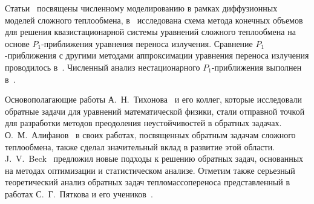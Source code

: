     Статьи~\cite{kovtanyuk2013iterative, Thommes2002, Pinnau2008, Siewert1991}
    посвящены численному моделированию в рамках
    диффузионных моделей сложного теплообмена, в~\cite{gallouet2016analysis} исследована схема
    метода конечных объемов для решения квазистационарной системы
    уравнений сложного теплообмена на основе
    $P_1$-приближения уравнения переноса излучения.
    Сравнение $P_1$-приближения с другими методами
    аппроксимации уравнения переноса излучения проводилось
    в~\cite{modest2014elliptic, frank2011adaptive, kovtanyuk2012, Thommes2002, Larsen2002, Frank2007}.
    Численный анализ нестационарного $P_1$-приближения выполнен
    в~\cite{Addam2015, olbrant2013asymptotic, frank2010optimal, frank2011adaptive, Frank2007}.

    Основополагающие работы А.\ Н.\ Тихонова~\cite{TikhonovSamarskii1972} и его коллег, которые
    исследовали обратные задачи для уравнений математической физики, стали
    отправной точкой для разработки методов преодоления неустойчивостей в обратных задачах.
    О.\ М.\ Алифанов~\cite{Aliphanov77, Aliphanov99, Aliphanov2009}
    в своих работах, посвященных обратным задачам сложного теплообмена, также
    сделал значительный вклад в развитие этой области.
    J.\ V.\ Beck~\cite{Beck1985-fg} предложил
    новые подходы к решению обратных задач, основанных на методах
    оптимизации и статистическом анализе.
    Отметим также серьезный теоретический анализ обратных задач тепломассопереноса
    представленный в работах С.\ Г.\ Пяткова и его учеников~\cite{Pyatkov19, Pyatkov22, Pyatkov23}.


